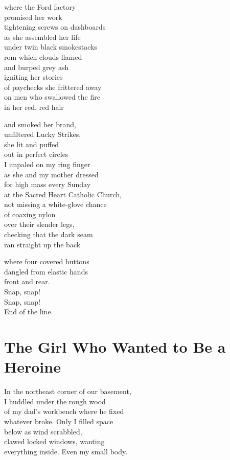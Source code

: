 \documentclass[twoside,10pt]{book}
\begin{document}
where the Ford factory\\
promised her work\\
tightening screws on dashboards\\
as she assembled her life\\
under twin black smokestacks\\
rom which clouds flamed\\
and burped grey ash\\
igniting her stories\\
of paychecks she frittered away\\
on men who swallowed the fire\\
in her red, red hair

and smoked her brand,\\
unfiltered Lucky Strikes,\\
she lit and puffed\\
out in perfect circles\\
I impaled on my ring finger\\
as she and my mother dressed\\
for high mass every Sunday\\
at the Sacred Heart Catholic Church,\\
not missing a white-glove chance\\
of coaxing nylon\\
over their slender legs,\\
checking that the dark seam\\
ran straight up the back

where four covered buttons\\
dangled from elastic hands\\
front and rear.\\
Snap, snap!\\
Snap, snap!\\
End of the line.


\clearpage
\section{The Girl Who Wanted to Be a Heroine}

In the northeast corner of our basement,\\
I huddled under the rough wood\\
of my dad's workbench where he fixed\\
whatever broke. Only I filled space\\
below as wind scrabbled,\\
clawed locked windows, wanting\\
everything inside. Even my small body.
\end{document}
